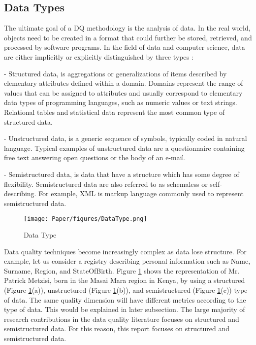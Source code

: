 \documentclass[pdftex,english,oribibl]{llncs}
\begin{document}
\subsection{Data Types}\label{sec:DataTypes}

The ultimate goal of a DQ methodology is the analysis of data.
In the real world, objects need to be created in a format that could further be stored, retrieved, and processed by software programs.
In the field of data and computer science, data are either implicitly or explicitly distinguished by three types \cite{Batini2009MethodologiesForDataQuality}:

- Structured data, is aggregations or generalizations of items described by elementary attributes defined within a domain.
Domains represent the range of values that can be assigned to attributes and usually correspond to elementary data types of programming languages, such as numeric values or text strings.
Relational tables and statistical data represent the most common type of structured data.

- Unstructured data, is a generic sequence of symbols, typically coded in natural language.
Typical examples of unstructured data are a questionnaire containing free text answering open questions or the body of an e-mail.

- Semistructured data, is data that have a structure which has some degree of flexibility. Semistructured data are also referred to as schemaless or self-describing. For example, XML is markup language commonly used to represent semistructured data.
\begin{comment}
Some common characteristics are:
(1) data can contain fields not known at design time; for instance, an XML file does not have an associated XML schema file;
(2) the same kind of data may be represented in multiple ways; for example, a date might be represented by one field or by multiple fields, even within a single data set; and
(3) among the fields known at design time, many fields will not have values.
\end{comment}

  \begin{figure}
    \centering
    \texttt{[image: Paper/figures/DataType.png]}
    \caption{Data Type \cite{Batini2009MethodologiesForDataQuality}}
    \label{fig:datatype}
  \end{figure}

 Data quality techniques become increasingly complex as data lose structure. For example, let us consider a registry describing personal information such as Name, Surname, Region, and StateOfBirth. Figure \ref{fig:datatype} shows the representation of Mr. Patrick Metzisi, born in the Masai Mara region in Kenya, by using a structured (Figure \ref{fig:datatype}(a)), unstructured (Figure \ref{fig:datatype}(b)), and semistructured (Figure \ref{fig:datatype}(c)) type of data.
 The same quality dimension will have different metrics according to the type of data. This would be explained in later subsection.
 The large majority of research contributions in the data quality literature focuses on structured and semistructured data. For this reason, this report focuses on structured and semistructured data.
\end{document}
